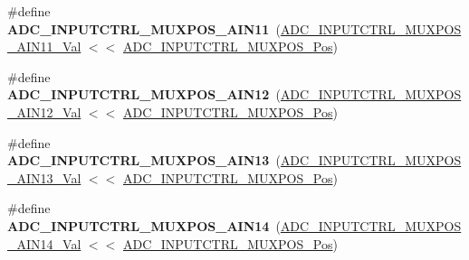 \begin{DoxyCompactItemize}
\item 
\hypertarget{group___s_a_m_l21___a_d_c_ga700a0d67674c2ab771dc522d2fee8422}{}\#define {\bfseries A\+D\+C\+\_\+\+I\+N\+P\+U\+T\+C\+T\+R\+L\+\_\+\+M\+U\+X\+P\+O\+S\+\_\+\+A\+I\+N11}~(\hyperlink{group___s_a_m_l21___a_d_c_ga0e221af1407d390a01a75b42e38b2e0c}{A\+D\+C\+\_\+\+I\+N\+P\+U\+T\+C\+T\+R\+L\+\_\+\+M\+U\+X\+P\+O\+S\+\_\+\+A\+I\+N11\+\_\+\+Val} $<$$<$ \hyperlink{group___s_a_m_l21___a_d_c_ga583868be285e1c06c9a93dfd552d8c6a}{A\+D\+C\+\_\+\+I\+N\+P\+U\+T\+C\+T\+R\+L\+\_\+\+M\+U\+X\+P\+O\+S\+\_\+\+Pos})\label{group___s_a_m_l21___a_d_c_ga700a0d67674c2ab771dc522d2fee8422}

\item 
\hypertarget{group___s_a_m_l21___a_d_c_ga8b14e3c51a18d42841256a652e5302f3}{}\#define {\bfseries A\+D\+C\+\_\+\+I\+N\+P\+U\+T\+C\+T\+R\+L\+\_\+\+M\+U\+X\+P\+O\+S\+\_\+\+A\+I\+N12}~(\hyperlink{group___s_a_m_l21___a_d_c_ga458774096cef14109980fca96a7ceb66}{A\+D\+C\+\_\+\+I\+N\+P\+U\+T\+C\+T\+R\+L\+\_\+\+M\+U\+X\+P\+O\+S\+\_\+\+A\+I\+N12\+\_\+\+Val} $<$$<$ \hyperlink{group___s_a_m_l21___a_d_c_ga583868be285e1c06c9a93dfd552d8c6a}{A\+D\+C\+\_\+\+I\+N\+P\+U\+T\+C\+T\+R\+L\+\_\+\+M\+U\+X\+P\+O\+S\+\_\+\+Pos})\label{group___s_a_m_l21___a_d_c_ga8b14e3c51a18d42841256a652e5302f3}

\item 
\hypertarget{group___s_a_m_l21___a_d_c_ga1e4662e7061ffceed74a052cafd5c27f}{}\#define {\bfseries A\+D\+C\+\_\+\+I\+N\+P\+U\+T\+C\+T\+R\+L\+\_\+\+M\+U\+X\+P\+O\+S\+\_\+\+A\+I\+N13}~(\hyperlink{group___s_a_m_l21___a_d_c_ga152571a42b1857c123bf55d3204ac530}{A\+D\+C\+\_\+\+I\+N\+P\+U\+T\+C\+T\+R\+L\+\_\+\+M\+U\+X\+P\+O\+S\+\_\+\+A\+I\+N13\+\_\+\+Val} $<$$<$ \hyperlink{group___s_a_m_l21___a_d_c_ga583868be285e1c06c9a93dfd552d8c6a}{A\+D\+C\+\_\+\+I\+N\+P\+U\+T\+C\+T\+R\+L\+\_\+\+M\+U\+X\+P\+O\+S\+\_\+\+Pos})\label{group___s_a_m_l21___a_d_c_ga1e4662e7061ffceed74a052cafd5c27f}

\item 
\hypertarget{group___s_a_m_l21___a_d_c_gaaf345423f4e55952e563ac128f8ef3fd}{}\#define {\bfseries A\+D\+C\+\_\+\+I\+N\+P\+U\+T\+C\+T\+R\+L\+\_\+\+M\+U\+X\+P\+O\+S\+\_\+\+A\+I\+N14}~(\hyperlink{group___s_a_m_l21___a_d_c_ga6ca65f998850d5f1f86cf8edbc3b4d31}{A\+D\+C\+\_\+\+I\+N\+P\+U\+T\+C\+T\+R\+L\+\_\+\+M\+U\+X\+P\+O\+S\+\_\+\+A\+I\+N14\+\_\+\+Val} $<$$<$ \hyperlink{group___s_a_m_l21___a_d_c_ga583868be285e1c06c9a93dfd552d8c6a}{A\+D\+C\+\_\+\+I\+N\+P\+U\+T\+C\+T\+R\+L\+\_\+\+M\+U\+X\+P\+O\+S\+\_\+\+Pos})\label{group___s_a_m_l21___a_d_c_gaaf345423f4e55952e563ac128f8ef3fd}


\end{DoxyCompactItemize}
